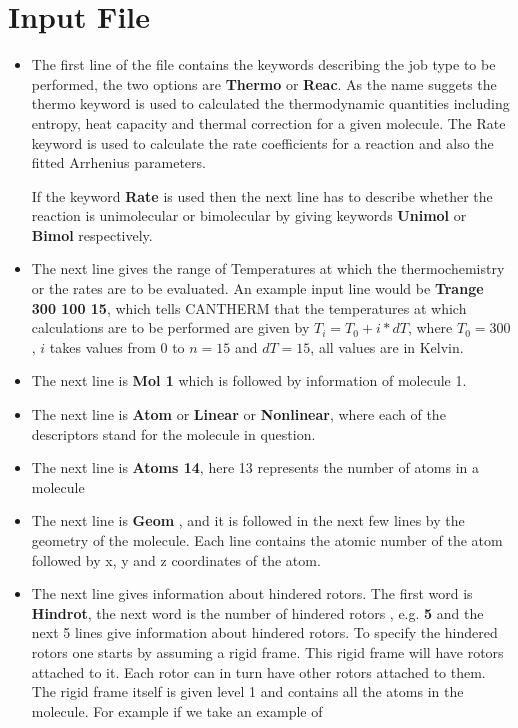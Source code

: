 \documentclass[a4paper,12pt]{article}
\begin{document}
\section{Input File}
\begin{itemize}
 \item The first line of the file contains the keywords describing the job type to be performed, the two options are \textbf{Thermo} or \textbf{Reac}. As the name suggets the thermo keyword is used to calculated the thermodynamic quantities including entropy, heat capacity and thermal correction for a given molecule. The Rate keyword is used to calculate the rate coefficients for a reaction and also the fitted Arrhenius parameters.

If the keyword \textbf{Rate} is used then the next line has to describe whether the reaction is unimolecular or bimolecular by giving keywords \textbf{Unimol} or \textbf{Bimol} respectively.

\item The next line gives the range of Temperatures at which the thermochemistry or the rates are to be evaluated. An example input line would be \textbf{Trange 300 100 15}, which tells CANTHERM that the temperatures at which calculations are to be performed are given by $T_i = T_0 + i*dT$, where $T_0=300$, $i$ takes values from 0 to $n=15$ and $dT=15$, all values are in Kelvin.

\item The next line is \textbf{Mol 1} which is followed by information of molecule 1.
\item The next line is \textbf{Atom} or \textbf{Linear}  or \textbf{Nonlinear}, where each of the descriptors stand for the molecule in question.
\item The next line is \textbf{Atoms 14}, here 13 represents the number of atoms in a molecule
\item The next line is \textbf{Geom }, and it is followed in the next few lines by the geometry of the molecule. Each line contains the atomic number of the atom followed by x, y and z coordinates of the atom.
\item The next line gives information about hindered rotors. The first word is \textbf{Hindrot}, the next word is the number of hindered rotors , e.g. \textbf{5} and the next 5 lines give information about hindered rotors. To specify the hindered rotors one starts by assuming a rigid frame. This rigid frame will have rotors attached to it. Each rotor can in turn have other rotors attached to them. The rigid frame itself is given level 1 and contains all the atoms in the molecule. For example if we take an example of

\end{itemize}
\end{document}
